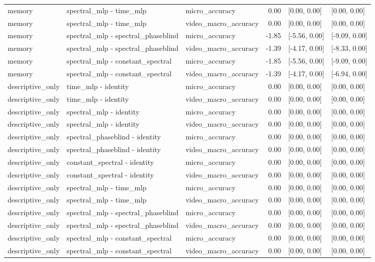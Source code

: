 \begin{tabular}{lllrll}
memory & spectral\_mlp - time\_mlp & micro\_accuracy & 0.00 & [0.00, 0.00] & [0.00, 0.00] \\
memory & spectral\_mlp - time\_mlp & video\_macro\_accuracy & 0.00 & [0.00, 0.00] & [0.00, 0.00] \\
memory & spectral\_mlp - spectral\_phaseblind & micro\_accuracy & -1.85 & [-5.56, 0.00] & [-9.09, 0.00] \\
memory & spectral\_mlp - spectral\_phaseblind & video\_macro\_accuracy & -1.39 & [-4.17, 0.00] & [-8.33, 0.00] \\
memory & spectral\_mlp - constant\_spectral & micro\_accuracy & -1.85 & [-5.56, 0.00] & [-9.09, 0.00] \\
memory & spectral\_mlp - constant\_spectral & video\_macro\_accuracy & -1.39 & [-4.17, 0.00] & [-6.94, 0.00] \\
descriptive\_only & time\_mlp - identity & micro\_accuracy & 0.00 & [0.00, 0.00] & [0.00, 0.00] \\
descriptive\_only & time\_mlp - identity & video\_macro\_accuracy & 0.00 & [0.00, 0.00] & [0.00, 0.00] \\
descriptive\_only & spectral\_mlp - identity & micro\_accuracy & 0.00 & [0.00, 0.00] & [0.00, 0.00] \\
descriptive\_only & spectral\_mlp - identity & video\_macro\_accuracy & 0.00 & [0.00, 0.00] & [0.00, 0.00] \\
descriptive\_only & spectral\_phaseblind - identity & micro\_accuracy & 0.00 & [0.00, 0.00] & [0.00, 0.00] \\
descriptive\_only & spectral\_phaseblind - identity & video\_macro\_accuracy & 0.00 & [0.00, 0.00] & [0.00, 0.00] \\
descriptive\_only & constant\_spectral - identity & micro\_accuracy & 0.00 & [0.00, 0.00] & [0.00, 0.00] \\
descriptive\_only & constant\_spectral - identity & video\_macro\_accuracy & 0.00 & [0.00, 0.00] & [0.00, 0.00] \\
descriptive\_only & spectral\_mlp - time\_mlp & micro\_accuracy & 0.00 & [0.00, 0.00] & [0.00, 0.00] \\
descriptive\_only & spectral\_mlp - time\_mlp & video\_macro\_accuracy & 0.00 & [0.00, 0.00] & [0.00, 0.00] \\
descriptive\_only & spectral\_mlp - spectral\_phaseblind & micro\_accuracy & 0.00 & [0.00, 0.00] & [0.00, 0.00] \\
descriptive\_only & spectral\_mlp - spectral\_phaseblind & video\_macro\_accuracy & 0.00 & [0.00, 0.00] & [0.00, 0.00] \\
descriptive\_only & spectral\_mlp - constant\_spectral & micro\_accuracy & 0.00 & [0.00, 0.00] & [0.00, 0.00] \\
descriptive\_only & spectral\_mlp - constant\_spectral & video\_macro\_accuracy & 0.00 & [0.00, 0.00] & [0.00, 0.00] \\
\bottomrule
\end{tabular}

